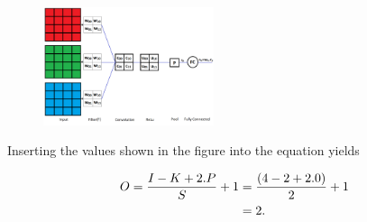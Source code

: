 \begin{vbframe}
 \begin{figure}
    \centering
    \includegraphics[width=5cm]{figure/3channel.png}
  \end{figure}

Inserting the values shown in the figure into the equation yields

\begin{align} 
O= \frac{I - K + 2.P}{S} + 1&={(4 - 2 + 2.0)\over 2} + 1\\ 
&=2. 
\end{align}

\end{vbframe}



\endlecture
